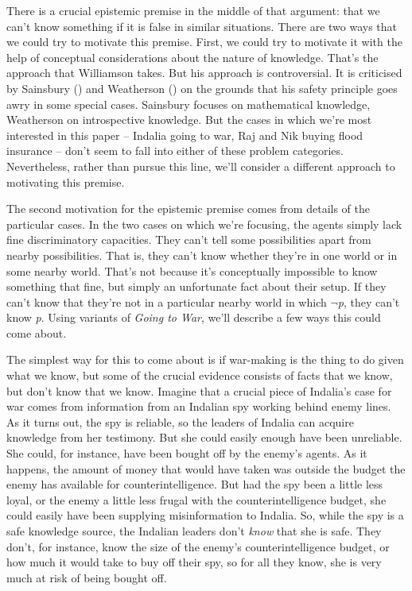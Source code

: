 \documentclass[
  11pt,
  letterpaper,
  DIV=11,
  numbers=noendperiod]{scrartcl}
\begin{document}
There is a crucial epistemic premise in the middle of that argument:
that we can't know something if it is false in similar situations. There
are two ways that we could try to motivate this premise. First, we could
try to motivate it with the help of conceptual considerations about the
nature of knowledge. That's the approach that Williamson takes. But his
approach is controversial. It is criticised by Sainsbury
() and Weatherson
() on the grounds that his
safety principle goes awry in some special cases. Sainsbury focuses on
mathematical knowledge, Weatherson on introspective knowledge. But the
cases in which we're most interested in this paper -- Indalia going to
war, Raj and Nik buying flood insurance -- don't seem to fall into
either of these problem categories. Nevertheless, rather than pursue
this line, we'll consider a different approach to motivating this
premise.

The second motivation for the epistemic premise comes from details of
the particular cases. In the two cases on which we're focusing, the
agents simply lack fine discriminatory capacities. They can't tell some
possibilities apart from nearby possibilities. That is, they can't know
whether they're in one world or in some nearby world. That's not because
it's conceptually impossible to know something that fine, but simply an
unfortunate fact about their setup. If they can't know that they're not
in a particular nearby world in which \(\neg\)\emph{p}, they can't know
\emph{p}. Using variants of \emph{Going to War}, we'll describe a few
ways this could come about.

The simplest way for this to come about is if war-making is the thing to
do given what we know, but some of the crucial evidence consists of
facts that we know, but don't know that we know. Imagine that a crucial
piece of Indalia's case for war comes from information from an Indalian
spy working behind enemy lines. As it turns out, the spy is reliable, so
the leaders of Indalia can acquire knowledge from her testimony. But she
could easily enough have been unreliable. She could, for instance, have
been bought off by the enemy's agents. As it happens, the amount of
money that would have taken was outside the budget the enemy has
available for counterintelligence. But had the spy been a little less
loyal, or the enemy a little less frugal with the counterintelligence
budget, she could easily have been supplying misinformation to Indalia.
So, while the spy is a safe knowledge source, the Indalian leaders don't
\emph{know} that she is safe. They don't, for instance, know the size of
the enemy's counterintelligence budget, or how much it would take to buy
off their spy, so for all they know, she is very much at risk of being
bought off.
\end{document}

